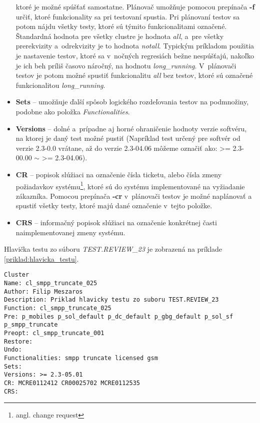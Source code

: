 \begin{itemize}
ktoré je možné spúšťať samostatne. 
Plánovač umožňuje pomocou prepínača \textbf{-f} určiť, ktoré 
funkcionality sa pri testovaní spustia.
Pri plánovaní testov sa potom nájdu všetky testy, ktoré sú týmito 
funkcionalitami označené.
Štandardná hodnota pre všetky clustre je hodnota \textit{all}, a~pre 
všetky prerekvizity a~odrekvizity je to hodnota \textit{notall}.
Typickým príkladom použitia je nastavenie testov, ktoré sa v~nočných 
regresiách bežne nespúšťajú, nakoľko je ich beh príliš časovo náročný, 
na hodnotu \textit{long\_running}.
V~plánovači testov je potom možné spustiť funkcionalitu \textit{all} bez testov, 
ktoré sú označené funkcionalitou \textit{long\_running}.
\item \textbf{Sets} -- umožňuje ďalší spôsob logického rozdeľovania testov 
na podmnožiny, podobne ako položka \textit{Functionalities}.
\item \textbf{Versions} -- dolné a~prípadne aj horné ohraničenie hodnoty 
verzie softvéru, na ktorej je daný test možné pustiť
(Napríklad test určený pre softvér od verzie 2.3-0.0 vrátane, 
až do verzie 2.3-04.06 môžeme označiť ako: \textgreater= 2.3-00.00 
$\sim$ \textgreater= 2.3-04.06).
\item \textbf{CR} -- popisok slúžiaci na označenie čísla ticketu, alebo 
čísla zmeny požiadavkov systému\footnote{angl. change request}, ktoré sú 
do systému implementované na vyžiadanie zákazníka. 
Pomocou prepínača \textbf{-cr} v~plánovači testov je možné naplánovať a~
spustiť všetky testy, ktoré majú dané označenie v~tejto položke.
\item \textbf{CRS} -- informačný popisok slúžiaci na označenie konkrétnej 
časti naimplementovanej zmeny systému. 
\end{itemize}

Hlavička testu zo súboru \emph{TEST.REVIEW\_23} je zobrazená na 
príklade \ref{priklad:hlavicka_testu}.

\noindent\begin{minipage}{\textwidth}
\begin{lstlisting}[caption=Hlavička testu,label=priklad:hlavicka_testu]
Cluster
Name: cl_smpp_truncate_025
Author: Filip Meszaros
Description: Priklad hlavicky testu zo suboru TEST.REVIEW_23
Function: cl_smpp_truncate_025
Pre: p_mobiles p_sol_default p_dc_default p_gbg_default p_sol_sf p_smpp_truncate
Preopt: cl_smpp_truncate_001
Restore:
Undo:
Functionalities: smpp truncate licensed gsm
Sets:
Versions: >= 2.3-05.01
CR: MCRE0112412 CR00025702 MCRE0112535
CRS:
\end{lstlisting}
\end{minipage}

